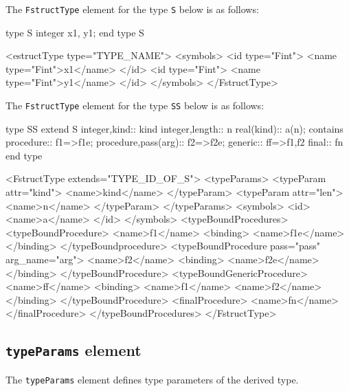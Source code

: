 The {\tt FstructType} element for the type {\tt S} below is as follows:
\vspace{2mm}

\begin{Fexample90}
type S
    integer x1, y1;
end type S
\end{Fexample90}
\vspace{1mm}

\begin{XcodeMLFExample}
<estructType type="TYPE_NAME">
  <symbols>
    <id type="Fint">
      <name type="Fint">x1</name>
    </id>
    <id type="Fint">
      <name type="Fint">y1</name>
    </id>
  </symbols>
</FstructType>
\end{XcodeMLFExample}

The {\tt FstructType} element for the type {\tt SS} below is as follows:
\vspace{2mm}

\begin{Fexample2008}
type SS extend S
	integer,kind:: kind
    integer,length:: n
    real(kind):: a(n);
contains
	procedure:: f1=>f1e;
	procedure,pass(arg):: f2=>f2e;
	generic:: ff=>f1,f2
	final:: fn
end type
\end{Fexample2008}
\vspace{1mm}

\begin{XcodeMLFExample}
<FstructType extends="TYPE_ID_OF_S">
  <typeParams>
    <typeParam attr="kind">
      <name>kind</name>
    </typeParam>
    <typeParam attr="len">
      <name>n</name>
    </typeParam>
  </typeParams>
  <symbols>
 <id>
      <name>a</name>
    </id>
  </symbols>
<typeBoundProcedures>
 <typeBoundProcedure>
      <name>f1</name>
	  <binding>
	     <name>f1e</name>
	  </binding>
    </typeBoundprocedure>
<typeBoundProcedure pass="pass" arg_name="arg">
      <name>f2</name>
	  <binding>
	      <name>f2e</name>
	  </binding>
    </typeBoundProcedure>
<typeBoundGenericProcedure>
  <name>ff</name>
  <binding>
        <name>f1</name>
<name>f2</name>
</binding>
    </typeBoundProcedure>
<finalProcedure>
      <name>fn</name>
    </finalProcedure>
  </typeBoundProcedures>
</FstructType>
\end{XcodeMLFExample}


\subsection{ {\tt typeParams} element}

The {\tt typeParams} element defines type parameters of the derived type.

